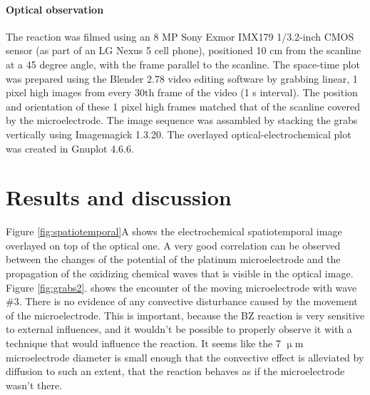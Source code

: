 \documentclass[3p, twocolumn]{elsarticle}
\begin{document}
\paragraph{Optical observation}
The reaction was filmed using an 8 MP Sony Exmor IMX179 1/3.2-inch CMOS sensor (as part of an LG Nexus 5 cell phone), positioned 10 cm from the scanline at a 45 degree angle, with the frame parallel to the scanline.
The space-time plot was prepared using the Blender 2.78 video editing software by grabbing linear, 1 pixel high images from every 30th frame of the video (1 s interval).
The position and orientation of these 1 pixel high frames matched that of the scanline covered by the microelectrode.
The image sequence was assambled by stacking the grabs vertically using Imagemagick 1.3.20.
The overlayed optical-electrochemical plot was created in Gnuplot 4.6.6.



\section{Results and discussion}

Figure \ref{fig:spatiotemporal}A shows the electrochemical spatiotemporal image overlayed on top of the optical one.
A very good correlation can be observed between the changes of the potential of the platinum microelectrode and the propagation of the oxidizing chemical waves that is visible in the optical image.
Figure \ref{fig:grabs2}. shows the encounter of the moving microelectrode with wave \#3.
There is no evidence of any convective disturbance caused by the movement of the microelectrode.
This is important, because the BZ reaction is very sensitive to external influences, and it wouldn't be possible to properly observe it with a technique that would influence the reaction.
It seems like the 7 $\upmu$m microelectrode diameter is small enough that the convective effect is alleviated by diffusion to such an extent, that the reaction behaves as if the microelectrode wasn't there.

\end{document}
